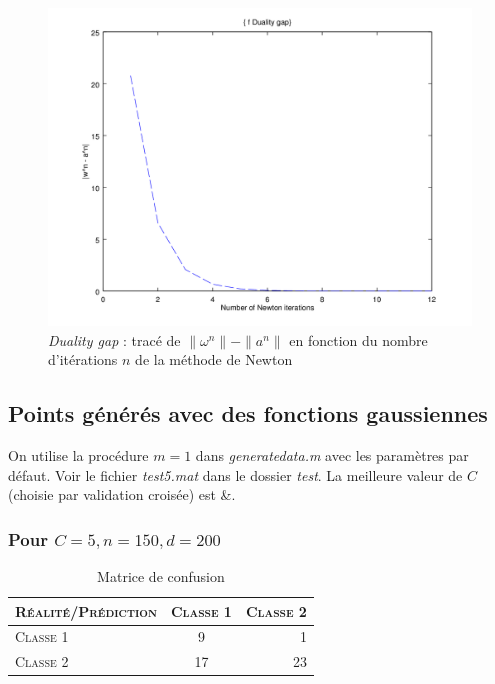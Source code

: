 \documentclass{article}
\begin{document}
         \begin{figure}
           \begin{center}
             \subfigure\includegraphics[scale=0.5]{images/duality4.png}
             \caption{\emph{Duality gap} : tracé de $\|\omega^n\| - \|a^n\|$ en fonction du nombre d'itérations $n$ de la méthode de Newton}
           \end{center}
         \end{figure}

\subsection{Points générés avec des fonctions gaussiennes}

On utilise la procédure $m=1$ dans \emph{generatedata.m} avec les paramètres par défaut. Voir le fichier \emph{test5.mat} dans le dossier \emph{test}. La meilleure valeur de $C$ (choisie par validation croisée) est &.

\subsubsection{Pour $C=5, n=150, d=200$}

     \begin{table}[H]
       \caption{Matrice de confusion}
       \begin{tabular}{|l|c|r|}
         \hline
         \textsc{Réalité/Prédiction} & \textsc{Classe 1} & \textsc{Classe 2}\\
         \hline
         \textsc{Classe 1} & 9 & 1\\
         \hline
         \textsc{Classe 2} & 17 & 23\\
         \hline
       \end{tabular}
     \end{table}
\end{document}
